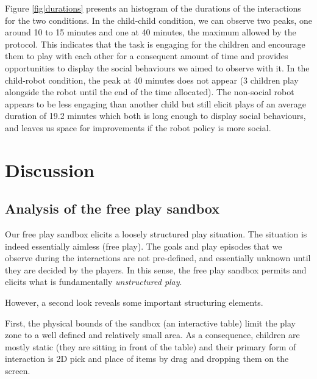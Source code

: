\documentclass[sigconf]{acmart}
\begin{document}
Figure \ref{fig|durations} presents an histogram of the durations of the
interactions for the two conditions. In the child-child condition, we can
observe two peaks, one around 10 to 15 minutes and one at 40 minutes, the
maximum allowed by the protocol. This indicates that the task is engaging for
the children and encourage them to play with each other for a consequent amount
of time and provides opportunities to display the social behaviours we aimed to
observe with it. In the child-robot condition, the peak at 40 minutes does not
appear (3 children play alongside the robot until the end of the time
allocated). The non-social robot appears to be less engaging than another child
but still elicit plays of an average duration of 19.2 minutes which both is
long enough to display social behaviours, and leaves us space for improvements
if the robot policy is more social.


\section{Discussion}
\label{sec:discussion}

\subsection{Analysis of the free play sandbox}

Our free play sandbox elicits a loosely structured play situation. The
situation is indeed essentially aimless (free play). The goals and play episodes
that we observe during the interactions are not pre-defined, and essentially
unknown until they are decided by the players. In this sense, the free play
sandbox permits and elicits what is fundamentally \emph{unstructured play}.

However, a second look reveals some important structuring elements.

First, the physical bounds of the sandbox (an interactive table) limit the
play zone to a well defined and relatively small area. As a consequence,
children are mostly static (they are sitting in front of the table) and their
primary form of interaction is 2D pick and place of items by drag and dropping
them on the screen.
\end{document}
